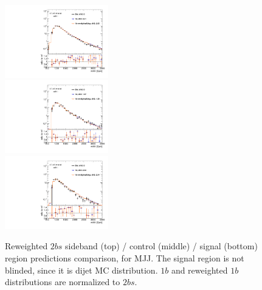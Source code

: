 \begin{figure}[htbp!]
\begin{center}
\includegraphics[width=0.4\textwidth,angle=-90]{figures/boosted/AppendixReweight/Compare/Dijet_Sideband_directcompare_mHH_l_1.pdf}\\
\includegraphics[width=0.4\textwidth,angle=-90]{figures/boosted/AppendixReweight/Compare/Dijet_Control_directcompare_mHH_l_1.pdf}\\
\includegraphics[width=0.4\textwidth,angle=-90]{figures/boosted/AppendixReweight/Compare/Dijet_Signal_directcompare_mHH_l_1.pdf}
\caption{Reweighted $2bs$ sideband (top) / control (middle) / signal (bottom) region predictions comparison, for MJJ. The signal region is not blinded, since it is dijet MC distribution. $1b$ and reweighted $1b$ distributions are normalized to $2bs$.}
\label{fig:app-rw-comp-dijet-2bs}
\end{center}
\end{figure}

\clearpage